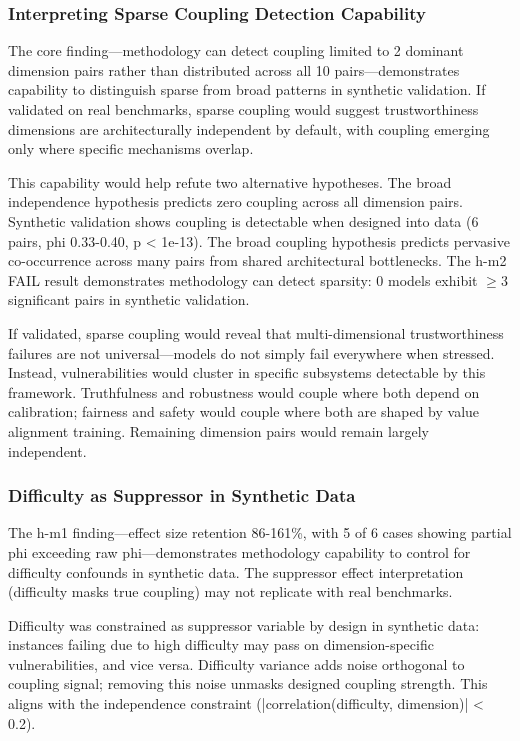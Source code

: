 
\subsubsection{Interpreting Sparse Coupling Detection Capability}

The core finding---methodology can detect coupling limited to 2 dominant dimension pairs rather than distributed across all 10 pairs---demonstrates capability to distinguish sparse from broad patterns in synthetic validation. If validated on real benchmarks, sparse coupling would suggest trustworthiness dimensions are architecturally independent by default, with coupling emerging only where specific mechanisms overlap.

This capability would help refute two alternative hypotheses. The broad independence hypothesis predicts zero coupling across all dimension pairs. Synthetic validation shows coupling is detectable when designed into data (6 pairs, phi 0.33-0.40, p < 1e-13). The broad coupling hypothesis predicts pervasive co-occurrence across many pairs from shared architectural bottlenecks. The h-m2 FAIL result demonstrates methodology can detect sparsity: 0 models exhibit $\geq 3$ significant pairs in synthetic validation.

If validated, sparse coupling would reveal that multi-dimensional trustworthiness failures are not universal---models do not simply fail everywhere when stressed. Instead, vulnerabilities would cluster in specific subsystems detectable by this framework. Truthfulness and robustness would couple where both depend on calibration; fairness and safety would couple where both are shaped by value alignment training. Remaining dimension pairs would remain largely independent.

\subsubsection{Difficulty as Suppressor in Synthetic Data}

The h-m1 finding---effect size retention 86-161\%, with 5 of 6 cases showing partial phi exceeding raw phi---demonstrates methodology capability to control for difficulty confounds in synthetic data. The suppressor effect interpretation (difficulty masks true coupling) may not replicate with real benchmarks.

Difficulty was constrained as suppressor variable by design in synthetic data: instances failing due to high difficulty may pass on dimension-specific vulnerabilities, and vice versa. Difficulty variance adds noise orthogonal to coupling signal; removing this noise unmasks designed coupling strength. This aligns with the independence constraint (|correlation(difficulty, dimension)| < 0.2).

